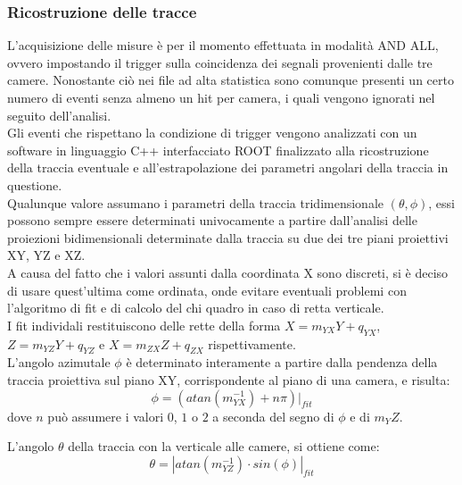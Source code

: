 \documentclass[8pt]{extarticle}
\begin{document}
\subsubsection{Ricostruzione delle tracce} \label{subsub:algoritmo}
L’acquisizione delle misure è per il momento effettuata in modalità AND ALL, ovvero impostando il trigger sulla coincidenza dei segnali provenienti dalle tre camere. Nonostante ciò nei file ad alta statistica sono comunque presenti un certo numero di eventi senza almeno un hit per camera, i quali vengono ignorati nel seguito dell’analisi.\\
Gli eventi che rispettano la condizione di trigger vengono analizzati con un software in linguaggio C++ interfacciato ROOT finalizzato alla ricostruzione della traccia eventuale e all’estrapolazione dei parametri angolari della traccia in questione.\\

Qualunque valore assumano i parametri della traccia tridimensionale $(\theta, \phi)$, essi possono sempre essere determinati univocamente a partire dall'analisi delle proiezioni bidimensionali determinate dalla traccia su due dei tre piani proiettivi XY, YZ e XZ. \\
A causa del fatto che i valori assunti dalla coordinata X sono discreti, si è deciso di usare quest'ultima come ordinata, onde evitare eventuali problemi con l'algoritmo di fit e di calcolo del chi quadro in caso di retta verticale.\\
I fit individali restituiscono delle rette della forma $X=m_{YX}Y+q_{YX}$, $Z=m_{YZ}Y+q_{YZ}$ e $X = m_{ZX}Z + q_{ZX}$ rispettivamente.
\\
L'angolo azimutale $\phi$ è determinato interamente a partire dalla pendenza della traccia proiettiva sul piano XY, corrispondente al piano di una camera, e risulta: \\
\[ \phi= \left(atan(m_{YX}^{-1}) + n\pi \right) \rvert_{fit}\]
dove $n$ può assumere i valori $0$, $1$ o $2$ a seconda del segno di $\phi$ e di $m_YZ$.

L'angolo $\theta$ della traccia con la verticale alle camere, si ottiene come: \\

\[ \theta = |atan\left(m_{YZ}^{-1} \right) \cdot sin(\phi)|_{fit} \]
\end{document}
